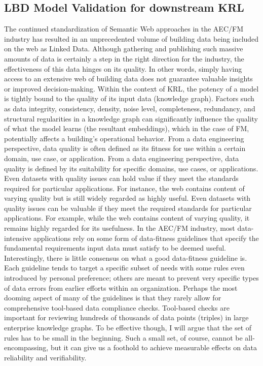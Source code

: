 \subsection{\ac{LBD} Model Validation for downstream \ac{KRL}}
The continued standardization of Semantic Web approaches in the \ac{AEC/FM} industry has resulted in an unprecedented volume of building data being included on the web as Linked Data. Although gathering and publishing such massive amounts of data is certainly a step in the right direction for the industry, the effectiveness of this data hinges on its quality. In other words, simply having access to an extensive web of building data does not guarantee valuable insights or improved decision-making. Within the context of \ac{KRL}, the potency of a model is tightly bound to the quality of its input data (knowledge graph). Factors such as data integrity, consistency, density, noise level, completeness, redundancy, and structural regularities in a knowledge graph can significantly influence the quality of what the model learns (the resultant embeddings), which in the case of \ac{FM}, potentially affects a building's operational behavior. From a data engineering perspective, data quality is often defined as its fitness for use within a certain domain, use case, or application. From a data engineering perspective, data quality is defined by its suitability for specific domains, use cases, or applications. Even datasets with quality issues can hold value if they meet the standards required for particular applications. For instance, the web contains content of varying quality but is still widely regarded as highly useful. Even datasets with quality issues can be valuable if they meet the required standards for particular applications. For example, while the web contains content of varying quality, it remains highly regarded for its usefulness. In the AEC/FM industry, most data-intensive applications rely on some form of data-fitness guidelines that specify the fundamental requirements input data must satisfy to be deemed useful. Interestingly, there is little consensus on what a good data-fitness guideline is. Each guideline tends to target a specific subset of needs with some rules even introduced by personal preference; others are meant to prevent very specific types of data errors from earlier efforts within an organization. Perhaps the most dooming aspect of many of the guidelines is that they rarely allow for comprehensive tool-based data compliance checks. Tool-based checks are important for reviewing hundreds of thousands of data points (triples) in large enterprise knowledge graphs. To be effective though, I will argue that the set of rules has to be small in the beginning. Such a small set, of course, cannot be all-encompassing, but it can give us a foothold to achieve measurable effects on data reliability and verifiability. 

